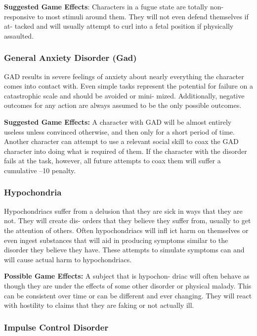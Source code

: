 \textbf{Suggested Game Effects}: Characters in a fugue state 
are totally non-responsive to most stimuli around 
them. They will not even defend themselves if at-
tacked and will usually attempt to curl into a fetal 
position if physically assaulted.

\subsubsection{General Anxiety Disorder (Gad)}

GAD results in severe feelings of anxiety about nearly 
everything the character comes into contact with. 
Even simple tasks represent the potential for failure 
on a catastrophic scale and should be avoided or mini-
mized. Additionally, negative outcomes for any action 
are always assumed to be the only possible outcomes.

\textbf{Suggested Game Effects: }A character with GAD will 
be almost entirely useless unless convinced otherwise, 
and then only for a short period of time. Another 
character can attempt to use a relevant social skill to 
coax the GAD character into doing what is required 
of them. If the character with the disorder fails at the 
task, however, all future attempts to coax them will 
suffer a cumulative –10 penalty.

\subsubsection{Hypochondria}

Hypochondriacs suffer from a delusion that they are 
sick in ways that they are not. They will create dis-
orders that they believe they suffer from, usually to 
get the attention of others. Often hypochondriacs will 
infl ict harm on themselves or even ingest substances 
that will aid in producing symptoms similar to the 
disorder they believe they have. These attempts to 
simulate symptoms can and will cause actual harm to 
hypochondriacs.

\textbf{Possible Game Effects: }A subject that is hypochon-
driac will often behave as though they are under the 
effects of some other disorder or physical malady. 
This can be consistent over time or can be different 
and ever changing. They will react with hostility to 
claims that they are faking or not actually ill.

\subsubsection{Impulse Control Disorder}

